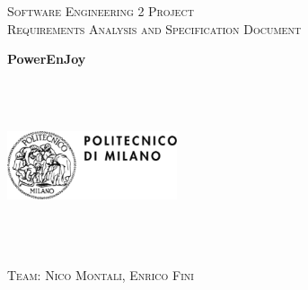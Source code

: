 \documentclass[a4paper,12pt,oneside]{book}
\begin{document}
	
	\pagestyle{empty}\centering
	\textsc{\Large Software Engineering 2 Project\\}
	\textsc{Requirements Analysis and Specification Document}

	\vfill

	\textbf{\Huge PowerEnJoy}
	
	\vfill
	\begin{center}	
	\includegraphics[width=5cm,height=5cm,keepaspectratio]{polimi}
	\end{center}
	\textsc{\Large Team: Nico Montali, Enrico Fini}
	
	\tableofcontents
	\clearpage
	
\end{document}
